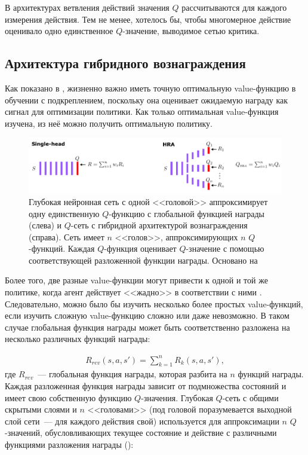 В архитектурах ветвления действий значения $Q$ рассчитываются для каждого измерения действия. Тем не менее, хотелось бы, чтобы многомерное действие оценивало одно единственное $Q$-значение, выводимое сетью критика.

\subsection{Архитектура гибридного вознаграждения}

Как показано в \cite{seijen2017hybrid}, жизненно важно иметь точную оптимальную value-функцию в обучении с подкреплением, поскольку она оценивает ожидаемую награду как сигнал для оптимизации политики. Как только оптимальная value-функция изучена, из неё можно получить оптимальную политику.

\begin{figure}[ht!]
    \center
    \includegraphics [scale=0.80] {my_folder/images/ch2/hybrid-reward.png}
    \caption{Глубокая нейронная сеть с одной <<головой>> аппроксимирует одну единственную $Q$-функцию с глобальной функцией награды (слева) и $Q$-сеть с гибридной архитектурой вознаграждения (справа). Сеть имеет $n$ <<голов>>, аппроксимирующих $n$ $Q$-функций. Каждая $Q$-функция оценивает $Q$-значение с помощью соответствующей разложенной функции награды. Основано на \cite{seijen2017hybrid}}
    \label{fig:ch2-hybrid-reward}
\end{figure}

Более того, две разные value-функции могут привести к одной и той же политике, когда агент действует <<жадно>> в соответствии с ними \cite{seijen2017hybrid}. Следовательно, можно было бы изучить несколько более простых value-функций, если изучить сложную value-функцию сложно или даже невозможно. В таком случае глобальная функция награды может быть соответственно разложена на несколько различных функций награды:

\begin{equation}
    \begin{multlined}
        R_{rev}(s, a, s') = \sum^n_{k=1} R_k (s, a, s'),
    \end{multlined}
\end{equation}
где $R_{rev}$~--- глобальная функция награды, которая разбита на $n$ функций награды. Каждая разложенная функция награды зависит от подмножества состояний и имеет свою собственную функцию $Q$-значения. Глубокая $Q$-сеть с общими скрытыми слоями и $n$ <<головами>> (под головой поразумевается выходной слой сети~--- для каждого действия свой) используется для аппроксимации $n$ $Q$-значений, обусловливающих текущее состояние и действие с различными функциями разложения награды ():

